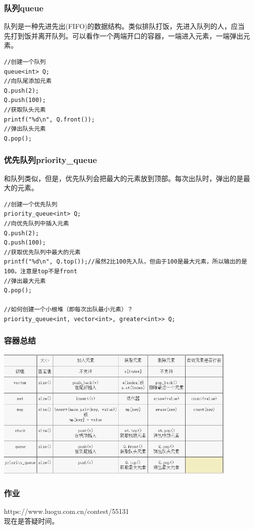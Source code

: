 \documentclass{beamer}
\begin{document}
\begin{frame}[fragile]
    \frametitle{队列queue}
    队列是一种先进先出(FIFO)的数据结构。类似排队打饭，先进入队列的人，应当先打到饭并离开队列。可以看作一个两端开口的容器，一端进入元素，一端弹出元素。
    \begin{lstlisting}
//创建一个队列
queue<int> Q;
//向队尾添加元素
Q.push(2);
Q.push(100);
//获取队头元素
printf("%d\n", Q.front());
//弹出队头元素
Q.pop();
    \end{lstlisting}
    

\end{frame}

\begin{frame}[fragile]
    \frametitle{优先队列priority\_queue}
    和队列类似，但是，优先队列会把最大的元素放到顶部。每次出队时，弹出的是最大的元素。
    \begin{lstlisting}
//创建一个优先队列
priority_queue<int> Q;
//向优先队列中插入元素
Q.push(2);
Q.push(100);
//获取优先队列中最大的元素
printf("%d\n", Q.top());//虽然2比100先入队，但由于100是最大元素，所以输出的是100。注意是top不是front
//弹出最大元素
Q.pop();

//如何创建一个小根堆（即每次出队最小元素）？
priority_queue<int, vector<int>, greater<int>> Q;
    \end{lstlisting}
    

\end{frame}



\begin{frame}[fragile]
    \frametitle{容器总结}
    \includegraphics[height=6.5cm]{table.png}

\end{frame}

\begin{frame}
    \frametitle{作业}

    https://www.luogu.com.cn/contest/55131\\
    现在是答疑时间。


    

\end{frame}
\end{document}
